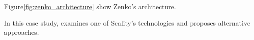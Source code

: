 Figure\ref{fig:zenko_architecture} show Zenko's architecture.






In this case study, examines one of Scality's technologies and proposes alternative approaches.


